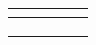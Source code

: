 \centering
\setlength{\tabcolsep}{3pt}
\begin{table}[h]
\begin{tabular}{|l|l|l|l|l|}
\hline
\multicolumn{5}{|l|}{} \\ \hline
   &    &    &    &    \\ \hline
   &    &    &    &    \\ \hline
   &    &    &    &    \\ \hline
\end{tabular}
\end{table}